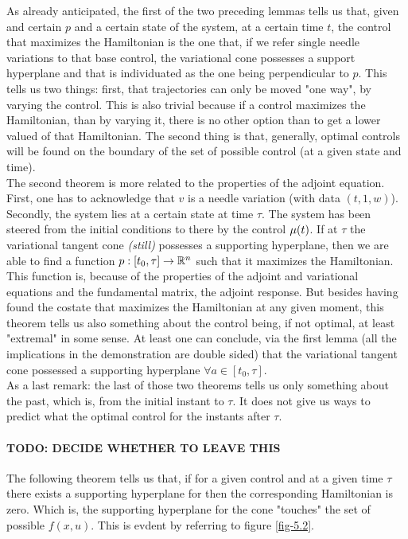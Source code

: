 As already anticipated, the first of the two preceding lemmas tells us that, given and certain $p$ and a certain state of the system, at a certain time $t$, the control that maximizes the Hamiltonian is the one that, if we refer single needle variations to that base control, the variational cone  possesses a support hyperplane and that is individuated as the one being perpendicular to $p$. This tells us two things: first, that trajectories can only be moved "one way", by varying the control. This is also trivial because if a control maximizes the Hamiltonian, than by varying it, there is no other option than to get a lower valued of that Hamiltonian. The second thing is that, generally, optimal controls will be found on the boundary of the set of possible control (at a given state and time).\\
The second theorem is more related to the properties of the adjoint equation. First, one has to acknowledge that $v$ is a needle variation (with data $(t,1,w)$). Secondly,  the system lies at a certain state at time $\tau$. The system has been steered from the initial conditions to there by the control $\mu(t)$. If at $\tau$ the variational tangent cone \textit{(still) }possesses a supporting hyperplane, then we are able to find a function $p:[t_0,\tau]\rightarrow\mathbb{R}^n$ such that it maximizes the Hamiltonian. This function is, because of the properties of the adjoint and variational equations and the fundamental matrix, the adjoint response. But besides having found the costate that maximizes the Hamiltonian at any given moment, this theorem tells us also something about the control being, if not optimal, at least "extremal" in some sense. At least one can conclude, via the first lemma (all the implications in the demonstration are double sided) that the variational tangent cone  possessed a supporting hyperplane $\forall a\in[t_0,\tau]$.\\
As a last remark: the last of those two theorems tells us only something about the past, which is, from the initial instant to $\tau$. It does not give us ways to predict what the optimal control for the instants after $\tau$.\\

\paragraph[TODO]{TODO: DECIDE WHETHER TO LEAVE THIS }
The following theorem tells us that, if for a given control and at a given time $\tau$ there exists a supporting hyperplane for \fixIntTanCone{\tau} then the corresponding Hamiltonian is zero. Which is, the supporting hyperplane for the cone "touches" the set of possible $f(x,u)$. This is evdent by referring to figure \ref{fig-5.2}. 

